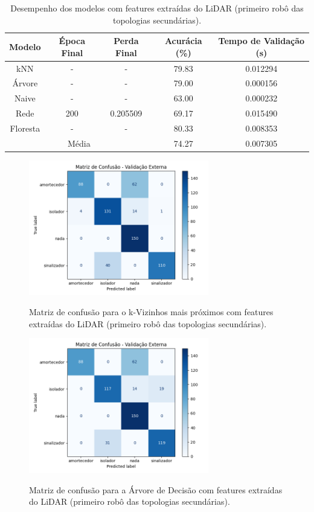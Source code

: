 \begin{table}[H]
\caption{Desempenho dos modelos com features extraídas do LiDAR (primeiro robô das topologias secundárias).}
\centering
\begin{tabular}{ccccc}
\hline
\textbf{Modelo} & \textbf{Época Final} & \textbf{Perda Final} & \textbf{Acurácia (\%)} & \textbf{Tempo de Validação (s)}  \\
\hline
kNN      & - & - & 79.83 & 0.012294 \\
Árvore   & - & - & 79.00 & 0.000156 \\
Naive    & - & - & 63.00 & 0.000232 \\
Rede     & 200 & 0.205509 & 69.17 & 0.015490 \\
Floresta & - & - & 80.33 & 0.008353 \\
\hline
\multicolumn{3}{c}{Média} & 74.27 & 0.007305 \\
\hline
\end{tabular}
\fonte{}
\label{tab:modelos_feat_lidar_robo1}
\end{table}

\begin{figure}[H]
\centering
\caption{Matriz de confusão para o k-Vizinhos mais próximos com features extraídas do LiDAR (primeiro robô das topologias secundárias).}
\includegraphics[width=0.7\textwidth]{figuras/Resultados/multi_primeiro_Teste4_knn.png}
\label{fig:mc_featlidar_knn_robo1_t4}
\fonte{}
\end{figure}

\begin{figure}[H]
\centering
\caption{Matriz de confusão para a Árvore de Decisão com features extraídas do LiDAR (primeiro robô das topologias secundárias).}
\includegraphics[width=0.7\textwidth]{figuras/Resultados/multi_primeiro_Teste4_tree.png}
\label{fig:mc_featlidar_tree_robo1_t4}
\fonte{}
\end{figure}

